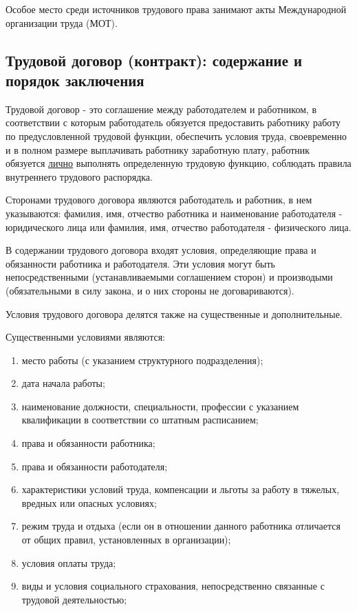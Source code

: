 Особое место среди источников трудового права занимают акты Международной организации труда (МОТ).

\subsection{Трудовой договор (контракт): содержание и порядок заключения}

Трудовой договор - это соглашение между работодателем и работником, в соответствии с которым работодатель обязуется предоставить работнику работу по предусловленной трудовой функции, обеспечить условия труда, своевременно и в полном размере выплачивать работнику заработную плату, работник обязуется \underline{лично} выполнять определенную трудовую функцию, соблюдать правила внутреннего трудового распорядка.

Сторонами трудового договора являются работодатель и работник, в нем указываются: фамилия, имя, отчество работника и наименование работодателя - юридического лица или фамилия, имя, отчество работодателя - физического лица.

В содержании трудового договора входят условия, определяющие права и обязанности работника и работодателя. Эти условия могут быть непосредственными (устанавливаемыми соглашением сторон) и производыми (обязательными в силу закона, и о них стороны не договариваются).

Условия трудового договора делятся также на существенные и дополнительные. 

Существенными условиями являются:
\begin{enumerate}
	\item место работы (с указанием структурного подразделения);
	\item дата начала работы;
	\item наименование должности, специальности, профессии с указанием квалификации в соответствии со штатным расписанием;
	\item права и обязанности работника;
	\item права и обязанности работодателя;
	\item характеристики условий труда, компенсации и льготы за работу в тяжелых, вредных или опасных условиях;
	\item режим труда и отдыха (если он в отношении данного работника отличается от общих правил, установленных в организации);
	\item условия оплаты труда;
	\item виды и условия социального страхования, непосредственно связанные с трудовой деятельностью;
\end{enumerate}


